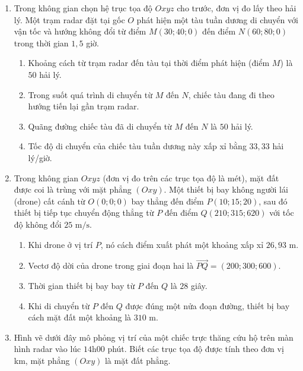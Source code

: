 \documentclass[12pt]{article}
\begin{document}
\begin{enumerate}[label=\textbf{Câu \arabic*:}, leftmargin=*]
		\item Trong không gian chọn hệ trục tọa độ $Oxyz$ cho trước, đơn vị đo lấy theo hải lý. Một trạm radar đặt tại gốc $O$ phát hiện một tàu tuần dương di chuyển với vận tốc và hướng không đổi từ điểm $M(30; 40; 0)$ đến điểm $N(60; 80; 0)$ trong thời gian $1,5$ giờ.
		\begin{enumerate}[label=\alph*)]
			\item Khoảng cách từ trạm radar đến tàu tại thời điểm phát hiện (điểm $M$) là $50$ hải lý.
			\item Trong suốt quá trình di chuyển từ $M$ đến $N$, chiếc tàu đang đi theo hướng tiến lại gần trạm radar.
			\item Quãng đường chiếc tàu đã di chuyển từ $M$ đến $N$ là $50$ hải lý.
			\item Tốc độ di chuyển của chiếc tàu tuần dương này xấp xỉ bằng $33,33$ hải lý/giờ.
		\end{enumerate}
		
		\vspace{3mm}
		\item Trong không gian $Oxyz$ (đơn vị đo trên các trục tọa độ là mét), mặt đất được coi là trùng với mặt phẳng $(Oxy)$. Một thiết bị bay không người lái (drone) cất cánh từ $O(0; 0; 0)$ bay thẳng đến điểm $P(10; 15; 20)$, sau đó thiết bị tiếp tục chuyển động thẳng từ $P$ đến điểm $Q(210; 315; 620)$ với tốc độ không đổi $25\text{ m/s}$.
		\begin{enumerate}[label=\alph*)]
			\item Khi drone ở vị trí $P$, nó cách điểm xuất phát một khoảng xấp xỉ $26,93\text{ m}$.
			\item Vectơ độ dời của drone trong giai đoạn hai là $\overrightarrow{PQ} = (200; 300; 600)$.
			\item Thời gian thiết bị bay bay từ $P$ đến $Q$ là $28$ giây.
			\item Khi di chuyển từ $P$ đến $Q$ được đúng một nửa đoạn đường, thiết bị bay cách mặt đất một khoảng là $310\text{ m}$.
		\end{enumerate}
		
		\vspace{3mm}
		\item Hình vẽ dưới đây mô phỏng vị trí của một chiếc trực thăng cứu hộ trên màn hình radar vào lúc $14$h$00$ phút. Biết các trục tọa độ được tính theo đơn vị km, mặt phẳng $(Oxy)$ là mặt đất phẳng.
		

\end{enumerate}
\end{document}
